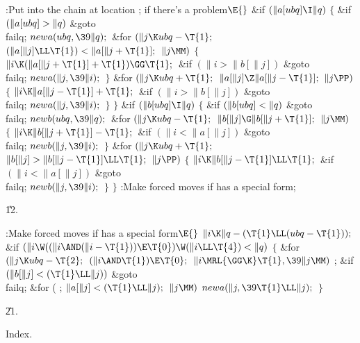 \Y\B\4:Put  into the chain at location ;  if there's a problem\X${}\E{}$\6
\&{if} ${}(\|a[\\{ubq}]\I\|q){}$\5
${}\{{}$\1\6
\&{if} ${}(\|a[\\{ubq}]>\|q){}$\1\5
\&{goto} \\{failq};\2\6
${}\\{newa}(\\{ubq},\39\|q);{}$\6
\&{for} ${}(\|j\K\\{ubq}-\T{1};{}$ ${}(\|a[\|j]\LL\T{1})<\|a[\|j+\T{1}];{}$ ${}%
\|j\MM){}$\5
${}\{{}$\1\6
${}\|i\K(\|a[\|j+\T{1}]+\T{1})\GG\T{1};{}$\6
\&{if} ${}(\|i>\|b[\|j]){}$\1\5
\&{goto} \\{failq};\2\6
${}\\{newa}(\|j,\39\|i);{}$\6
\4${}\}{}$\2\6
\&{for} ${}(\|j\K\\{ubq}+\T{1};{}$ ${}\|a[\|j]\Z\|a[\|j-\T{1}];{}$ ${}\|j%
\PP){}$\5
${}\{{}$\1\6
${}\|i\K\|a[\|j-\T{1}]+\T{1};{}$\6
\&{if} ${}(\|i>\|b[\|j]){}$\1\5
\&{goto} \\{failq};\2\6
${}\\{newa}(\|j,\39\|i);{}$\6
\4${}\}{}$\2\6
\4${}\}{}$\2\6
\&{if} ${}(\|b[\\{ubq}]\I\|q){}$\5
${}\{{}$\1\6
\&{if} ${}(\|b[\\{ubq}]<\|q){}$\1\5
\&{goto} \\{failq};\2\6
${}\\{newb}(\\{ubq},\39\|q);{}$\6
\&{for} ${}(\|j\K\\{ubq}-\T{1};{}$ ${}\|b[\|j]\G\|b[\|j+\T{1}];{}$ ${}\|j%
\MM){}$\5
${}\{{}$\1\6
${}\|i\K\|b[\|j+\T{1}]-\T{1};{}$\6
\&{if} ${}(\|i<\|a[\|j]){}$\1\5
\&{goto} \\{failq};\2\6
${}\\{newb}(\|j,\39\|i);{}$\6
\4${}\}{}$\2\6
\&{for} ${}(\|j\K\\{ubq}+\T{1};{}$ ${}\|b[\|j]>\|b[\|j-\T{1}]\LL\T{1};{}$ ${}%
\|j\PP){}$\5
${}\{{}$\1\6
${}\|i\K\|b[\|j-\T{1}]\LL\T{1};{}$\6
\&{if} ${}(\|i<\|a[\|j]){}$\1\5
\&{goto} \\{failq};\2\6
${}\\{newb}(\|j,\39\|i);{}$\6
\4${}\}{}$\2\6
\4${}\}{}$\2\6
:Make forced moves if  has a special form\X;\par
\U12.\fi

\B{}:Make forced moves if  has a special form\X${}\E{}$\6
$\|i\K\|q-(\T{1}\LL(\\{ubq}-\T{1}));{}$\6
\&{if} ${}(\|i\W((\|i\AND(\|i-\T{1}))\E\T{0})\W(\|i\LL\T{4})<\|q){}$\5
${}\{{}$\1\6
\&{for} ${}(\|j\K\\{ubq}-\T{2};{}$ ${}(\|i\AND\T{1})\E\T{0};{}$ ${}\|i\MRL{{%
\GG}{\K}}\T{1},\39\|j\MM){}$\1\5
;\2\6
\&{if} ${}(\|b[\|j]<(\T{1}\LL\|j)){}$\1\5
\&{goto} \\{failq};\2\6
\&{for} ( ; ${}\|a[\|j]<(\T{1}\LL\|j);{}$ ${}\|j\MM){}$\1\5
${}\\{newa}(\|j,\39\T{1}\LL\|j);{}$\2\6
\4${}\}{}$\2\par
\U21.\fi

Index.
\fi

\inx
\fin
\con
